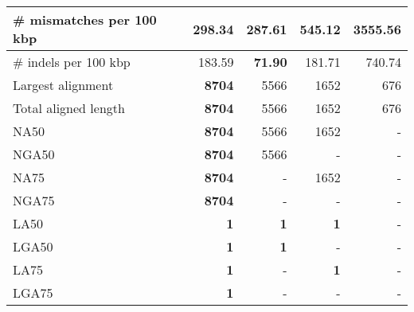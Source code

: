 \documentclass[12pt,a4paper]{article}
\begin{document}
\begin{table}[ht]
\begin{center}
\begin{tabular}{|l*{4}{|r}|}
\# mismatches per 100 kbp & 298.34 & {\bf 287.61} & 545.12 & 3555.56 \\ \hline
\# indels per 100 kbp & 183.59 & {\bf 71.90} & 181.71 & 740.74 \\ \hline
Largest alignment & {\bf 8704} & 5566 & 1652 & 676 \\ \hline
Total aligned length & {\bf 8704} & 5566 & 1652 & 676 \\ \hline
NA50 & {\bf 8704} & 5566 & 1652 & - \\ \hline
NGA50 & {\bf 8704} & 5566 & - & - \\ \hline
NA75 & {\bf 8704} & - & 1652 & - \\ \hline
NGA75 & {\bf 8704} & - & - & - \\ \hline
LA50 & {\bf 1} & {\bf 1} & {\bf 1} & - \\ \hline
LGA50 & {\bf 1} & {\bf 1} & - & - \\ \hline
LA75 & {\bf 1} & - & {\bf 1} & - \\ \hline
LGA75 & {\bf 1} & - & - & - \\ \hline
\end{tabular}
\end{center}
\end{table}
\end{document}
